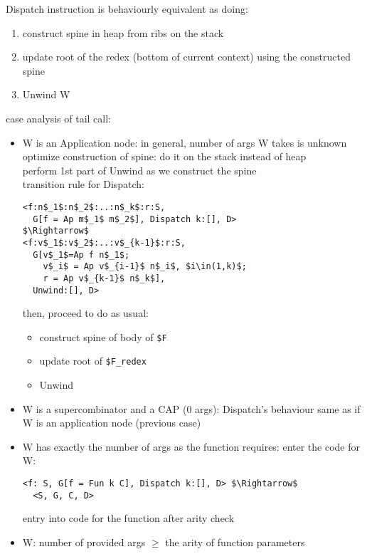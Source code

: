 \documentclass[8pt]{extarticle}
\begin{document}
\begin{multicols*}{2}
Dispatch instruction is behaviourly equivalent as doing:
\begin{enumerate}
\item construct spine in heap from ribs on the stack
\item update root of the redex (bottom of current context) using the constructed spine
\item Unwind W
\end{enumerate}

case analysis of tail call:
\begin{itemize}
\item W is an Application node: in general, number of args W takes is unknown\\
  optimize construction of spine: do it on the stack instead of heap\\
  perform 1st part of Unwind as we construct the spine\\

  transition rule for Dispatch:

\begin{lstlisting}
<f:n$_1$:n$_2$:..:n$_k$:r:S,
  G[f = Ap m$_1$ m$_2$], Dispatch k:[], D>
$\Rightarrow$
<f:v$_1$:v$_2$:..:v$_{k-1}$:r:S,
  G[v$_1$=Ap f n$_1$;
    v$_i$ = Ap v$_{i-1}$ n$_i$, $i\in(1,k)$;
    r = Ap v$_{k-1}$ n$_k$],
  Unwind:[], D>
\end{lstlisting}

then, proceed to do as usual:
\begin{itemize}
\item construct spine of body of \verb|$F|
\item update root of \verb|$F_redex|
\item Unwind
\end{itemize}

\item W is a supercombinator and a CAP (0 args):
  Dispatch's behaviour same as if W is an application node (previous case)

\item W has exactly the number of args as the function requires: enter the code for W:
\begin{lstlisting}
<f: S, G[f = Fun k C], Dispatch k:[], D> $\Rightarrow$
  <S, G, C, D>  
\end{lstlisting}

entry into code for the function after arity check

\item W: number of provided args $\geq$ the arity of function parameters


\end{itemize}
\end{multicols*}
\end{document}

